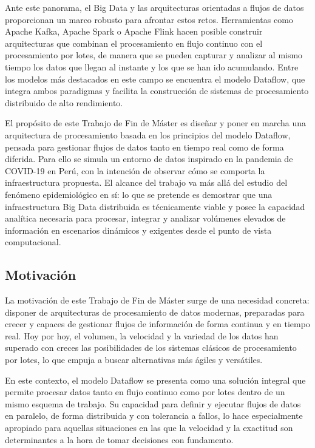 \documentclass[12pt,a4paper]{article}
\begin{document}
Ante este panorama, el Big Data y las arquitecturas orientadas a flujos de datos proporcionan un marco robusto para afrontar estos retos. Herramientas como Apache Kafka, Apache Spark o Apache Flink hacen posible construir arquitecturas que combinan el procesamiento en flujo continuo con el procesamiento por lotes, de manera que se pueden capturar y analizar al mismo tiempo los datos que llegan al instante y los que se han ido acumulando. Entre los modelos más destacados en este campo se encuentra el modelo Dataflow, que integra ambos paradigmas y facilita la construcción de sistemas de procesamiento distribuido de alto rendimiento.

El propósito de este Trabajo de Fin de Máster es diseñar y poner en marcha una arquitectura de procesamiento basada en los principios del modelo Dataflow, pensada para gestionar flujos de datos tanto en tiempo real como de forma diferida. Para ello se simula un entorno de datos inspirado en la pandemia de COVID-19 en Perú, con la intención de observar cómo se comporta la infraestructura propuesta. El alcance del trabajo va más allá del estudio del fenómeno epidemiológico en sí: lo que se pretende es demostrar que una infraestructura Big Data distribuida es técnicamente viable y posee la capacidad analítica necesaria para procesar, integrar y analizar volúmenes elevados de información en escenarios dinámicos y exigentes desde el punto de vista computacional.

\subsection{Motivación}\label{motivaciuxf3n}

La motivación de este Trabajo de Fin de Máster surge de una necesidad concreta: disponer de arquitecturas de procesamiento de datos modernas, preparadas para crecer y capaces de gestionar flujos de información de forma continua y en tiempo real. Hoy por hoy, el volumen, la velocidad y la variedad de los datos han superado con creces las posibilidades de los sistemas clásicos de procesamiento por lotes, lo que empuja a buscar alternativas más ágiles y versátiles.

En este contexto, el modelo Dataflow se presenta como una solución integral que permite procesar datos tanto en flujo continuo como por lotes dentro de un mismo esquema de trabajo. Su capacidad para definir y ejecutar flujos de datos en paralelo, de forma distribuida y con tolerancia a fallos, lo hace especialmente apropiado para aquellas situaciones en las que la velocidad y la exactitud son determinantes a la hora de tomar decisiones con fundamento.
\end{document}
